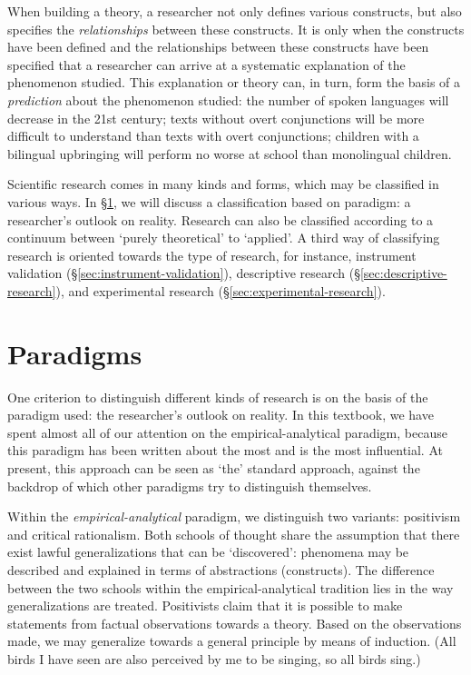 \documentclass[
]{book}
\begin{document}
When building a theory, a researcher not only defines various constructs, but also specifies the \emph{relationships} between these constructs. It is only when the constructs have been defined and the relationships between these constructs have been specified that a researcher can arrive at a systematic explanation of the phenomenon studied. This explanation or theory can, in turn, form the basis of a \emph{prediction} about the phenomenon studied: the number of spoken languages will decrease in the 21st century; texts without overt conjunctions will be more difficult to understand than texts with overt conjunctions; children with a bilingual upbringing will perform no worse at school than monolingual children.

Scientific research comes in many kinds and forms, which may be classified in various ways. In §\ref{sec:paradigms}, we will discuss a classification based on paradigm: a researcher's outlook on reality. Research can also be classified according to a continuum between `purely theoretical' to `applied'. A third way of classifying research is oriented towards the type of research, for instance, instrument validation (§\ref{sec:instrument-validation}), descriptive research (§\ref{sec:descriptive-research}), and experimental research (§\ref{sec:experimental-research}).

\hypertarget{sec:paradigms}{%
\section{Paradigms}\label{sec:paradigms}}

One criterion to distinguish different kinds of research is on the basis of the paradigm used: the researcher's outlook on reality. In this textbook, we have spent almost all of our attention on the empirical-analytical paradigm, because this paradigm has been written about the most and is the most influential. At present, this approach can be seen as `the' standard approach, against the backdrop of which other paradigms try to distinguish themselves.

Within the \emph{empirical-analytical} paradigm, we distinguish two variants: positivism and critical rationalism. Both schools of thought share the assumption that there exist lawful generalizations that can be `discovered': phenomena may be described and explained in terms of abstractions (constructs). The difference between the two schools within the empirical-analytical tradition lies in the way generalizations are treated. Positivists claim that it is possible to make statements from factual observations towards a theory. Based on the observations made, we may generalize towards a general principle by means of induction. (All birds I have seen are also perceived by me to be singing, so all birds sing.)
\end{document}
